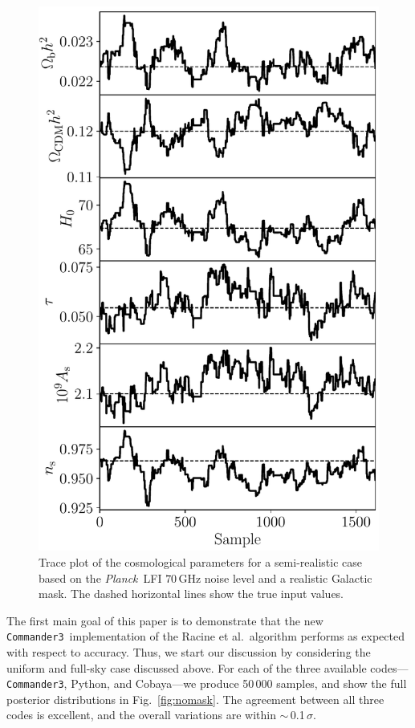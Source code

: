 \documentclass[twocolumn]{../common/aa}
\def\Planck{\emph{Planck}}
\def\commanderthree{\texttt{Commander3}}
\begin{document}
\begin{figure}
	\centering
	\includegraphics[width=\linewidth]{figures/realistic_chain.pdf}
	\caption{\label{fig:traceplot}Trace plot of the cosmological parameters for a semi-realistic case based on the \Planck\ LFI $70\,$GHz noise level and a realistic Galactic mask. The dashed horizontal lines show the true input values.}
\end{figure}


The first main goal of this paper is to demonstrate that the new \commanderthree\ implementation of the Racine et al.\ algorithm performs as expected with respect to accuracy. Thus, we start our discussion by considering the uniform and full-sky case discussed above. For each of the three available codes---\commanderthree, Python, and Cobaya---we produce 50\,000 samples, and show the full posterior distributions in Fig.~\ref{fig:nomask}. The agreement between all three codes is excellent, and the overall variations are within $\sim$\,0.1$\,\sigma$.
\end{document}
